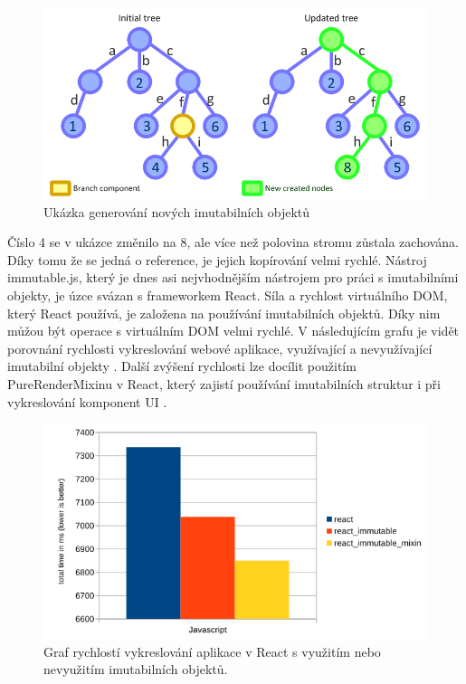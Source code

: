 \begin{figure}[h]
\begin{centering}
\includegraphics[scale=0.5]{obrazky/immutable_trees}
\par\end{centering}
\caption{Ukázka generování nových imutabilních objektů \cite{immutable_json} \label{fig:immutable_tree}}
\end{figure}

Číslo 4 se v ukázce změnilo na 8, ale více než polovina stromu zůstala zachována. Díky tomu že se jedná o reference, je jejich kopírování velmi rychlé. Nástroj immutable.js, který je dnes asi nejvhodnějším nástrojem pro práci s imutabilními objekty, je úzce svázan s frameworkem React. Síla a rychlost virtuálního DOM, který React používá, je založena na používání imutabilních objektů. Díky nim můžou být operace s virtuálním DOM velmi rychlé. V následujícím grafu je vidět porovnání rychlosti vykreslování webové aplikace, využívající a nevyužívající imutabilní objekty \cite{immutability_graph}. Další zvýšení rychlosti lze docílit použitím PureRenderMixinu v React, který zajistí používání imutabilních struktur i při vykreslování komponent UI \cite{react} \cite{immutablejs_learn}.

\begin{figure}[h]
\begin{centering}
\includegraphics[scale=0.6]{obrazky/immutable}
\par\end{centering}
\caption{Graf rychlostí vykreslování aplikace v React s využitím nebo nevyužitím imutabilních objektů. \cite{immutability_graph} \label{fig:react_immutable}}
\end{figure}
\FloatBarrier 

